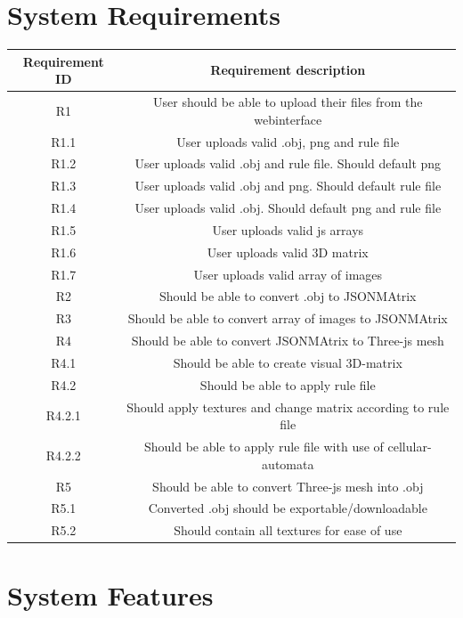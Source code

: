 \documentclass[english]{article}
\begin{document}
	
	\section{System Requirements}
	\begin{tabular}{||c | c||} 
		\hline
		Requirement ID & Requirement description \\ [0.5ex] 
		\hline\hline
		R1 & User should be able to upload their files from the webinterface \\ 
		\hline
		R1.1 & User uploads valid .obj, png and rule file \\ 
		\hline
		R1.2 & User uploads valid .obj and rule file. Should default png \\
		\hline
		R1.3 & User uploads valid .obj and png. Should default rule file \\
		\hline
		R1.4 & User uploads valid .obj. Should default png and rule file \\
		\hline
		R1.5 & User uploads valid js arrays \\
		\hline
		R1.6 & User uploads valid 3D matrix \\
		\hline
		R1.7 & User uploads valid array of images \\
		\hline
		R2 & Should be able to convert .obj to JSONMAtrix \\ 
		\hline
		R3 & Should be able to convert array of images to JSONMAtrix \\ 
		\hline
		R4 & Should be able to convert JSONMAtrix to Three-js mesh \\ 
		\hline
		R4.1 & Should be able to create visual 3D-matrix \\ 
		\hline
		R4.2 & Should be able to apply rule file \\ 
		\hline
		R4.2.1 & Should apply textures and change matrix according to rule file \\ 
		\hline
		R4.2.2 & Should be able to apply rule file with use of cellular-automata\\ 
		\hline
		R5 & Should be able to convert Three-js mesh into .obj\\ 
		\hline
		R5.1 & Converted .obj should be exportable/downloadable\\ 
		\hline
		R5.2 & Should contain all textures for ease of use\\ 
		\hline	
	\end{tabular}
	
		\pagebreak
	\section{System Features}		
\end{document}
